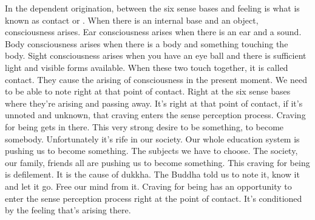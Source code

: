 \documentclass[letterpaper,10pt,english]{sphinxmanual}
\begin{document}
\sphinxAtStartPar
In  the  dependent  origination,  between  the  six  sense  bases  and  feeling is what is known as contact or
.
When  there  is  an
internal base and an object, consciousness arises. Ear consciousness arises
when there is an ear and a sound. Body consciousness arises when there is
a body and something touching the body. Sight consciousness arises when
you have an eye ball and there is sufficient light and visible forms available.
When these two touch together, it is called contact. They cause the arising
of consciousness in the present moment. We need to be able to note right at
that point of contact. Right at the six sense bases where they’re arising and
  passing away. It’s right at that point of contact, if it’s unnoted and unknown,
that craving enters the sense perception process. Craving for being gets in
there. This very strong desire to be something, to become somebody. Unfortunately it’s rife in our society. Our whole education system is pushing us to
become something. The subjects we have to choose. The society, our family,
friends  all  are  pushing  us  to  become  something. This  craving  for  being  is
defilement. It is the cause of dukkha. The Buddha told us to note it, know
it and let it go. Free our mind from it. Craving for being has an opportunity
to enter the sense perception process right at the point of contact. It’s conditioned by the feeling that’s arising there.
\end{document}
